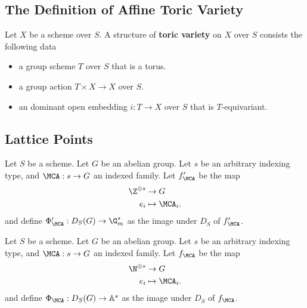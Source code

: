 \subsection{The Definition of Affine Toric Variety}


\begin{definition}
  \label{1-1-3-tor-var}
  \leanok
  Let $X$ be a scheme over $S$. A structure of {\bf toric variety} on $X$ over $S$ consists the following data
  \begin{itemize}
    \item a group scheme $T$ over $S$ that is a torus.
    \item a group action $T \times X \to X$ over $S$.
    \item an dominant open embedding $i : T \to X$ over $S$ that is $T$-equivariant.
  \end{itemize}
\end{definition}


\subsection{Lattice Points}

\begin{definition}
  \label{1-1-phiAprime}

  Let $S$ be a scheme. Let $G$ be an abelian group.
  Let $s$ be an arbitrary indexing type, and $\MCA : s \to G$ an indexed family.
  Let $f'_\MCA$ be the map
  \begin{align*}
    \Z^{\oplus s} & \to G \\
    e_i & \mapsto \MCA_i.
  \end{align*}
  and define $\Phi'_\MCA : D_S(G) \to \G_m^s$ as the image under $D_S$ of $f'_\MCA$.
\end{definition}

\begin{definition}
  \label{1-1-phiA}

  Let $S$ be a scheme. Let $G$ be an abelian group.
  Let $s$ be an arbitrary indexing type, and $\MCA : s \to G$ an indexed family.
  Let $f_\MCA$ be the map
  \begin{align*}
    \N^{\oplus s} & \to G \\
    e_i & \mapsto \MCA_i.
  \end{align*}
  and define $\Phi_\MCA : D_S(G) \to \mathbb A^s$ as the image under $D_S$ of $f_\MCA$.
\end{definition}


